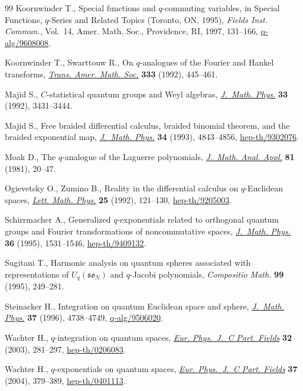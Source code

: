 \documentclass[pdftex]{sigma}
\numberwithin{equation}{section}
\begin{document}
\begin{thebibliography}{99}
Koornwinder T.,
Special functions and $q$-commuting variables,
in Special Functions, $q$-Series and Related Topics (Toronto, ON, 1995), {\it Fields Inst. Commun.}, Vol.~14, Amer. Math. Soc., Providence, RI, 1997, 131--166,
\href{http://arxiv.org/abs/q-alg/9608008}{q-alg/9608008}.

Koornwinder T., Swarttouw R.,
On $q$-analogues of the Fourier and Hankel transforms,
\href{http://dx.doi.org/10.2307/2154118}{{\it Trans. Amer. Math. Soc.}} {\bf333} (1992), 445--461.

Majid S.,
$C$-statistical quantum groups and Weyl algebras,
\href{http://dx.doi.org/10.1063/1.529891}{{\it J.~Math. Phys.}} {\bf33} (1992), 3431--3444.


Majid S.,
Free braided dif\/ferential calculus, braided binomial theorem, and the braided exponential map,
\href{http://dx.doi.org/10.1063/1.530326}{{\it J.~Math. Phys.}} {\bf34} (1993), 4843--4856,
\href{http://arxiv.org/abs/hep-th/9302076}{hep-th/9302076}.

Moak D.,
The $q$-analogue of the Laguerre polynomials,
\href{http://dx.doi.org/10.1016/0022-247X(81)90048-2}{{\it J.~Math. Anal. Appl.}} {\bf81} (1981), 20--47.

Ogievetsky O., Zumino B.,
Reality in the dif\/ferential calculus on $q$-Euclidean spaces,
\href{http://dx.doi.org/10.1007/BF00398308}{{\it Lett. Math. Phys.}} {\bf25} (1992), 121--130,
\href{http://arxiv.org/abs/hep-th/9205003}{hep-th/9205003}.

Schirrmacher A.,
Generalized $q$-exponentials related to orthogonal quantum groups and Fourier transformations of noncommutative spaces,
\href{http://dx.doi.org/10.1063/1.531136}{{\it J.~Math. Phys.}} {\bf36} (1995), 1531--1546,
\href{http://arxiv.org/abs/hep-th/9409132}{hep-th/9409132}.

Sugitani T.,
Harmonic analysis on quantum spheres associated with representations of $U_q(\mathfrak{so}_N)$ and $q$-Jacobi polynomials,
{\it Compositio Math.} {\bf 99} (1995), 249--281.

Steinacker H.,
Integration on quantum Euclidean space and sphere,
\href{http://dx.doi.org/10.1063/1.531658}{{\it J.~Math. Phys.}} {\bf 37} (1996), 4738--4749,
\href{http://arxiv.org/abs/q-alg/9506020}{q-alg/9506020}.

Wachter H.,
$q$-integration on quantum spaces,
\href{http://dx.doi.org/10.1140/epjc/s2003-01397-7}{{\it Eur. Phys.~J.~C Part. Fields}} {\bf32} (2003), 281--297,
\mbox{\href{http://arxiv.org/abs/hep-th/0206083}{hep-th/0206083}}.

Wachter H.,
$q$-exponentials on quantum spaces,
\href{http://dx.doi.org/10.1140/epjc/s2004-01999-5}{{\it Eur. Phys.~J.~C Part. Fields}} {\bf37} (2004), 379--389,
\mbox{\href{http://arxiv.org/abs/hep-th/0401113}{hep-th/0401113}}.


\end{thebibliography}\LastPageEnding
\end{document}
